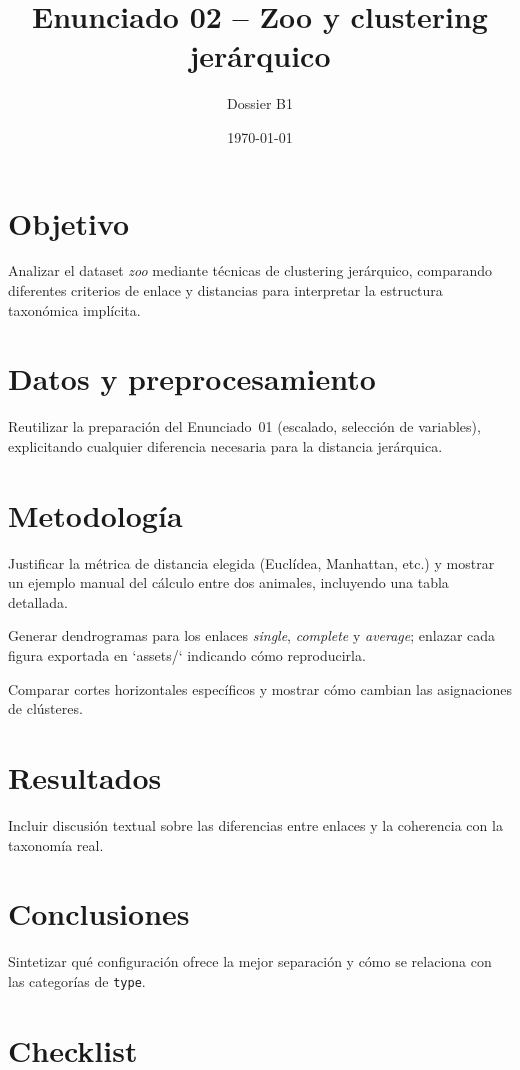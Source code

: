\documentclass[12pt]{article}
\title{Enunciado 02 -- Zoo y clustering jerárquico}
\author{Dossier B1}
\date{\today}
\begin{document}
\maketitle
\section{Objetivo}
Analizar el dataset \emph{zoo} mediante técnicas de clustering jerárquico, comparando diferentes criterios de enlace y distancias para interpretar la estructura taxonómica implícita.

\section{Datos y preprocesamiento}
Reutilizar la preparación del Enunciado~01 (escalado, selección de variables), explicitando cualquier diferencia necesaria para la distancia jerárquica.

\section{Metodología}
\begin{pasoapaso}
  \item Justificar la métrica de distancia elegida (Euclídea, Manhattan, etc.) y mostrar un ejemplo manual del cálculo entre dos animales, incluyendo una tabla detallada.
  \item Generar dendrogramas para los enlaces \emph{single}, \emph{complete} y \emph{average}; enlazar cada figura exportada en `assets/` indicando cómo reproducirla.
  \item Comparar cortes horizontales específicos y mostrar cómo cambian las asignaciones de clústeres.
\end{pasoapaso}

\section{Resultados}
Incluir discusión textual sobre las diferencias entre enlaces y la coherencia con la taxonomía real.

\section{Conclusiones}
Sintetizar qué configuración ofrece la mejor separación y cómo se relaciona con las categorías de \texttt{type}.

\section*{Checklist}
\ChecklistBase
\end{document}
